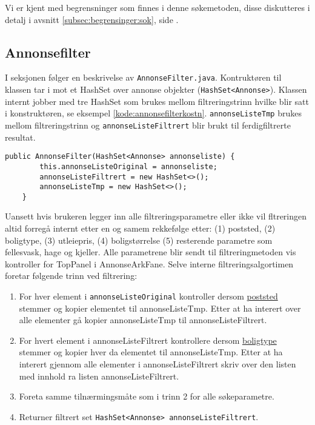 Vi er kjent med begrensninger som finnes i denne søkemetoden, disse diskutteres i detalj i avsnitt \ref{subsec:begrensinger:sok}, side \pageref{subsec:begrensinger:sok}.

\subsection{Annonsefilter} \label{sec:annonsesok}
I seksjonen følger en beskrivelse av \texttt{AnnonseFilter.java}. Kontruktøren til klassen tar i mot et HashSet over annonse objekter (\texttt{HashSet<Annonse>}). Klassen internt jobber med tre HashSet som brukes mellom filtreringstrinn hvilke blir satt i konstruktøren, se eksempel \ref{kode:annonsefilterkostn}. \texttt{annonseListeTmp} brukes mellom filtreringstrinn og \texttt{annonseListeFiltrert} blir brukt til ferdigfiltrerte resultat.

\begin{lstlisting}[caption=AnnonseFilter.java: Konstruktør, label=kode:annonsefilterkostn]
    public AnnonseFilter(HashSet<Annonse> annonseliste) {
        this.annonseListeOriginal = annonseliste;
        annonseListeFiltrert = new HashSet<>();
        annonseListeTmp = new HashSet<>();
    }
\end{lstlisting}

Uansett hvis brukeren legger inn alle filtreringsparametre eller ikke vil fltreringen altid forregå internt etter en og samem rekkefølge etter: (1) poststed, (2) boligtype, (3) utleiepris, (4) boligstørrelse (5) resterende parametre som fellesvask, hage og kjeller. Alle parametrene blir sendt til filtreringmetoden vis kontroller for TopPanel i AnnonseArkFane. Selve interne filtreringsalgortimen foretar følgende trinn ved filtrering:
\begin{enumerate}
\item For hver element i \texttt{annonseListeOriginal} kontroller dersom \underline{poststed} stemmer og kopier elementet til annonseListeTmp. Etter at ha interert over alle elementer gå kopier annonseListeTmp til annonseListeFiltrert. 
\item For hvert element i annonseListeFiltrert kontrollere dersom \underline{boligtype} stemmer og kopier hver da elementet til annonseListeTmp. Etter at ha interert gjennom alle elementer i annonseListeFiltrert skriv over den listen med innhold ra listen annonseListeFiltrert. 
\item Foreta samme tilnærmingsmåte som i trinn 2 for alle søkeparametre. 
\item Returner filtrert set \texttt{HashSet<Annonse> annonseListeFiltrert}.
\end{enumerate}


